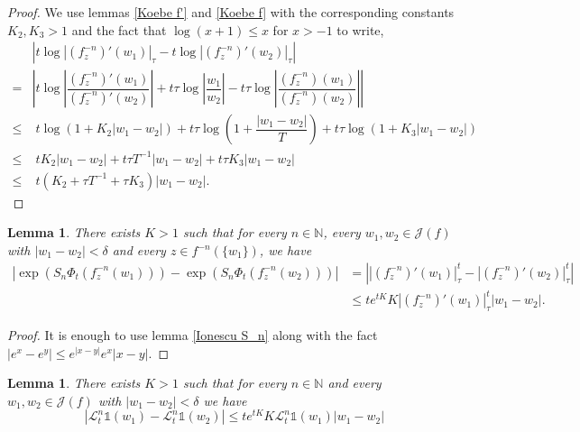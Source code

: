\documentclass[12pt,reqno]{amsart}
\newtheorem{lemma}[theorem]{Lemma}
\begin{document}
    \begin{proof}
    We use lemmas \ref{Koebe f'} and \ref{Koebe f} with the corresponding constants $K_2,K_3>1$ and the fact that $\log(x+1)\leq x$ for $x>-1$ to write,
    \begin{align*}
      &  \left|t\log\left|(f_z^{-n})'(w_1)\right|_{\tau} - t\log\left|(f_z^{-n})'(w_2)\right|_{\tau}\right| \\
       = & \left|t\log \left| \dfrac{(f_z^{-n})'(w_1)}{(f_z^{-n})'(w_2)} \right|+t\tau\log\left|\dfrac{w_1}{w_2} \right|-t\tau\log \left| \dfrac{(f_z^{-n})(w_1)}{(f_z^{-n})(w_2)} \right|\right| \\
       \leq & \;t\log \left(1+K_2|w_1-w_2| \right) +t\tau \log \left(1+\dfrac{|w_1-w_2|}{T} \right) +t\tau \log \left(1+K_3|w_1-w_2| \right)\\
       \leq &\; tK_2|w_1-w_2| +t\tau T^{-1}|w_1-w_2|+t\tau K_3|w_1-w_2| \\
       \leq &\; t(K_2+\tau T^{-1}+\tau K_3)|w_1-w_2|.
    \end{align*}
    \end{proof}
    \begin{lemma}\label{exp Ionescu S_n}
        There exists $K>1$ such that for every $n \in \mathbb{N}$, every $w_1,w_2 \in \mathcal{J}(f)$ with $|w_1-w_2|<\delta$ and  
        every $z \in f^{-n}(\{w_1 \})$, we have
        \begin{align*}
            \left| \exp\left(S_n\Phi_t\left(f^{-n}_z(w_1)\right)\right) -\exp\left(S_n\Phi_t\left(f^{-n}_z(w_2)\right)\right) \right| &= \left|\left|(f_z^{-n})'(w_1)\right|_{\tau}^t - \left|(f_z^{-n})'(w_2)\right|_{\tau}^t\right|\\
            & \leq te^{tK}K\left|(f_z^{-n})'(w_1)\right|_{\tau}^t|w_1-w_2|.
        \end{align*}
    \end{lemma}
    \begin{proof}
        It is enough to use lemma \ref{Ionescu S_n} along with the fact $|e^x-e^y|\leq e^{|x-y|}e^x|x-y|$.        
    \end{proof}
\begin{lemma}\label{distortion of transfer operator 0}
 There exists $K>1$ such that for every $n \in \mathbb{N}$ and every $w_1,w_2 \in \mathcal{J}(f)$ with $|w_1-w_2|<\delta$ we have
    $$\left| \mathcal{L}_t^n\mathbb{1}(w_1) - \mathcal{L}_t^n\mathbb{1}(w_2) \right| \leq te^{tK}K \mathcal{L}_t^n\mathbb{1}(w_1)|w_1-w_2| $$
\end{lemma}
\end{document}
